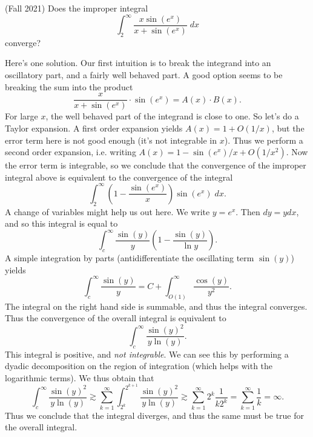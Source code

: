 \documentclass[answers]{exam}
\begin{document}
\begin{questions}
\question (Fall 2021) Does the improper integral
%
\[ \int_2^\infty \frac{x \sin(e^x)}{x + \sin(e^x)}\; dx \]
%
converge?
\begin{solution}
	Here's one solution. Our first intuition is to break the integrand into an oscillatory part, and a fairly well behaved part. A good option seems to be breaking the sum into the product
	\[ \frac{x}{x + \sin(e^x)} \cdot \sin(e^x) = A(x) \cdot B(x). \]
	For large $x$, the well behaved part of the integrand is close to one. So let's do a Taylor expansion. A first order expansion yields $A(x) = 1 + O(1/x)$, but the error term here is not good enough (it's not integrable in $x$). Thus we perform a second order expansion, i.e. writing $A(x) = 1 - \sin(e^x) / x + O(1/x^2)$. Now the error term is integrable, so we conclude that the convergence of the improper integral above is equivalent to the convergence of the integral
	\[ \int_2^\infty \left( 1 - \frac{\sin(e^x)}{x} \right) \sin(e^x)\; dx. \]
	A change of variables might help us out here. We write $y = e^x$. Then $dy = y dx$, and so this integral is equal to
	\[ \int_c^\infty \frac{\sin(y)}{y} \left( 1 - \frac{\sin(y)}{\ln y} \right). \]
	A simple integration by parts (antidifferentiate the oscillating term $\sin(y)$) yields
	\[ \int_c^\infty \frac{\sin(y)}{y} = C + \int_{O(1)}^\infty \frac{\cos(y)}{y^2}. \]
	The integral on the right hand side is summable, and thus the integral converges. Thus the convergence of the overall integral is equivalent to
	\[ \int_c^\infty \frac{\sin(y)^2}{y \ln(y)}. \]
	This integral is positive, and \emph{not integrable}. We can see this by performing a dyadic decomposition on the region of integration (which helps with the logarithmic terms). We thus obtain that
	\[ \int_c^\infty \frac{\sin(y)^2}{y \ln(y)} \gtrsim \sum_{k = 1}^\infty \int_{2^k}^{2^{k+1}} \frac{\sin(y)^2}{y \ln(y)} \gtrsim \sum_{k = 1}^\infty 2^k \frac{1}{k 2^k} = \sum_{k = 1}^\infty \frac{1}{k} = \infty. \]
	Thus we conclude that the integral diverges, and thus the same must be true for the overall integral.


\end{solution}
\end{questions}
\end{document}
